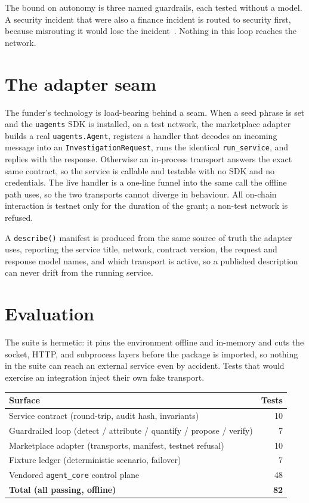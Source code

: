 \documentclass[11pt]{article}
\begin{document}
The bound on autonomy is three named guardrails, each tested without a model. A
security incident that were also a finance incident is routed to security first,
because misrouting it would lose the incident~\cite{nygard_2018_release}. Nothing
in this loop reaches the network.

\section{The adapter seam}

The funder's technology is load-bearing behind a seam. When a seed phrase is set
and the \texttt{uagents} SDK is installed, on a test network, the marketplace
adapter builds a real \texttt{uagents.Agent}, registers a handler that decodes an
incoming message into an \texttt{InvestigationRequest}, runs the identical
\texttt{run\_service}, and replies with the response. Otherwise an in-process
transport answers the exact same contract, so the service is callable and
testable with no SDK and no credentials. The live handler is a one-line funnel
into the same call the offline path uses, so the two transports cannot diverge in
behaviour. All on-chain interaction is testnet only for the duration of the
grant; a non-test network is refused.

A \texttt{describe()} manifest is produced from the same source of truth the
adapter uses, reporting the service title, network, contract version, the request
and response model names, and which transport is active, so a published
description can never drift from the running service.

\section{Evaluation}

The suite is hermetic: it pins the environment offline and in-memory and cuts the
socket, HTTP, and subprocess layers before the package is imported, so nothing in
the suite can reach an external service even by accident. Tests that would
exercise an integration inject their own fake transport.

\begin{center}
\begin{tabular}{lr}
\toprule
\textbf{Surface} & \textbf{Tests} \\
\midrule
Service contract (round-trip, audit hash, invariants) & 10 \\
Guardrailed loop (detect / attribute / quantify / propose / verify) & 7 \\
Marketplace adapter (transports, manifest, testnet refusal) & 10 \\
Fixture ledger (deterministic scenario, failover) & 7 \\
Vendored \texttt{agent\_core} control plane & 48 \\
\midrule
\textbf{Total (all passing, offline)} & \textbf{82} \\
\bottomrule
\end{tabular}
\end{center}
\end{document}
